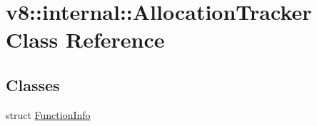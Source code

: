 \hypertarget{classv8_1_1internal_1_1_allocation_tracker}{}\section{v8\+:\+:internal\+:\+:Allocation\+Tracker Class Reference}
\label{classv8_1_1internal_1_1_allocation_tracker}
\subsection*{Classes}
\begin{DoxyCompactItemize}
\item 
struct \hyperlink{structv8_1_1internal_1_1_allocation_tracker_1_1_function_info}{Function\+Info}
\end{DoxyCompactItemize}
